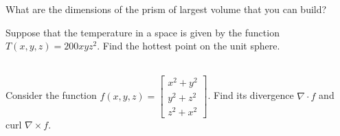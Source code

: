 What are the dimensions of the prism of largest volume that you can build?

\item
{}

Suppose that the temperature in a space is given by the function
$T(x,y,z) = 200xyz^2$.  Find the hottest point on the unit sphere.

\item
{}\\
Consider the function $f(x,y,z) = \begin{bmatrix}
                                   x^2 + y^2 \\
                                   y^2 + z^2 \\
                                   z^2 + x^2
                                  \end{bmatrix}$.
Find its divergence $\nabla \cdot f$ and curl $\nabla \times f$.

\EEN
